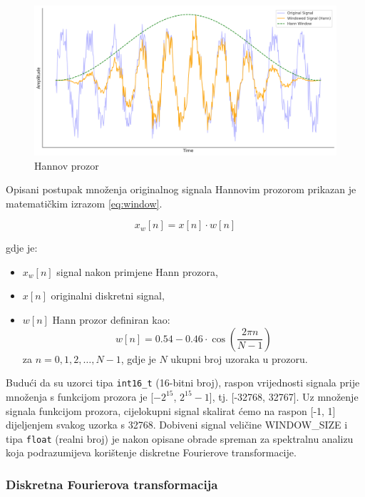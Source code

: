 \begin{figure}[htb]
    \centering
    \includegraphics[width=0.9\linewidth]{Chapters/struktura_sustava/generiranje_znacajki/hann.png} 
    \caption{Hannov prozor}
    \label{pic:hann}
\end{figure}

Opisani postupak množenja originalnog signala Hannovim prozorom prikazan je 
matematičkim izrazom \ref{eq:window}.

\begin{equation}
    x_w[n] = x[n] \cdot w[n]
    \label{eq:window}
\end{equation}

gdje je:
\begin{itemize}
    \item \( x_w[n] \) signal nakon primjene Hann prozora,
    \item \( x[n] \) originalni diskretni signal,
    \item \( w[n] \) Hann prozor definiran kao:
    \begin{equation}
        w[n] = 0.54 - 0.46 \cdot \cos\left( \frac{2 \pi n}{N-1} \right)
    \end{equation}
    za \( n = 0, 1, 2, \dots, N-1 \),
    gdje je \( N \) ukupni broj uzoraka u prozoru.
\end{itemize}

Budući da su uzorci tipa \texttt{int16\_t} (16-bitni broj), raspon vrijednosti signala 
prije množenja s funkcijom prozora je [$-2^{15}$, $2^{15} - 1$], tj. [-32768, 32767]. Uz množenje
signala funkcijom prozora, cijelokupni signal skalirat ćemo na raspon [-1, 1] dijeljenjem svakog
uzorka s 32768. Dobiveni signal veličine WINDOW\_SIZE i tipa \texttt{float} (realni broj) je nakon
opisane obrade spreman za spektralnu analizu koja podrazumijeva korištenje diskretne Fourierove
transformacije.

\subsubsection{Diskretna Fourierova transformacija}
\label{sec:fft}

